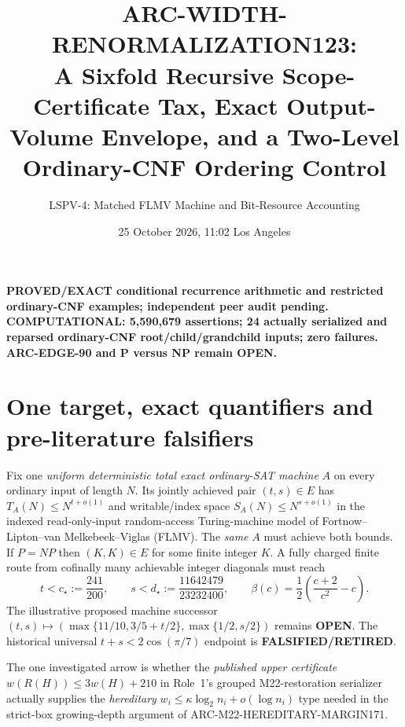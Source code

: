 \documentclass[11pt]{article}
\title{ARC-WIDTH-RENORMALIZATION123:\\
\large A Sixfold Recursive Scope-Certificate Tax, Exact Output-Volume Envelope,
and a Two-Level Ordinary-CNF Ordering Control}
\author{LSPV-4: Matched FLMV Machine and Bit-Resource Accounting}
\date{25 October 2026, 11:02 Los Angeles}
\newcommand{\OPEN}{\textbf{OPEN}}
\begin{document}
\maketitle
\begin{center}
\textbf{PROVED/EXACT conditional recurrence arithmetic and restricted ordinary-CNF examples; independent peer audit pending.}\\
\textbf{COMPUTATIONAL: 5,590,679 assertions; 24 actually serialized and reparsed ordinary-CNF root/child/grandchild inputs; zero failures.}\\
\textbf{ARC-EDGE-90 and P versus NP remain OPEN.}
\end{center}

\section{One target, exact quantifiers and pre-literature falsifiers}
Fix one \emph{uniform deterministic total exact ordinary-SAT machine} $A$
on every ordinary input of length $N$.  Its jointly achieved pair $(t,s)\in E$
has $T_A(N)\le N^{t+o(1)}$ and writable/index space
$S_A(N)\le N^{s+o(1)}$ in the indexed read-only-input random-access
Turing-machine model of Fortnow--Lipton--van Melkebeek--Viglas (FLMV).
The \emph{same} $A$ must achieve both bounds.
If $P=NP$ then $(K,K)\in E$ for some finite integer $K$.
A fully charged finite route from cofinally many achievable integer
diagonals must reach
\[
 t<c_\star:=\frac{241}{200},\qquad
 s<d_\star:=\frac{11642479}{23232400},\qquad
 \beta(c)=\frac12\left(\frac{c+2}{c^2}-c\right).
\]
The illustrative proposed machine successor
$(t,s)\mapsto(\max\{11/10,3/5+t/2\},\max\{1/2,s/2\})$
remains \OPEN.  The historical universal
$t+s<2\cos(\pi/7)$ endpoint is \textbf{FALSIFIED/RETIRED}.

The one investigated arrow is whether the \emph{published upper certificate}
$w(R(H))\le3w(H)+210$ in Role~1's grouped M22-restoration serializer
actually supplies the \emph{hereditary}
$w_i\le\kappa\log_2n_i+o(\log n_i)$ type needed in the
strict-box growing-depth argument of ARC-M22-HEREDITARY-MARGIN171.
\end{document}
